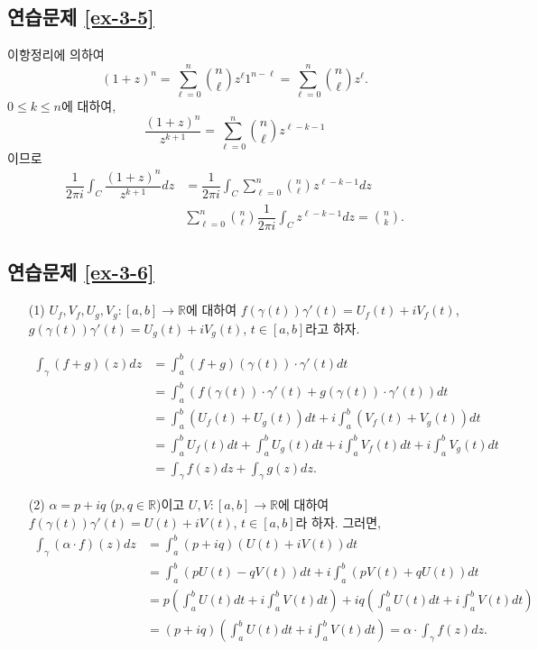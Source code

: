 \subsection*{연습문제 \ref{ex-3-5}}

이항정리에 의하여
\[
(1+z)^n = \sum_{\ell = 0}^n  {n \choose \ell} z^\ell 1^{n-\ell} 
= \sum_{\ell = 0}^n  {n \choose \ell} z^\ell.
\]
$0\le k \le n$에 대하여,
\[
\dfrac{(1+z)^n}{z^{k+1}} =\sum_{\ell = 0}^n  {n \choose \ell} z^{\ell-k-1}
\]
이므로
\begin{align*}
\dfrac1{2\pi i} \int_C \dfrac{(1+z)^n}{z^{k+1}}dz
&= \dfrac1{2\pi i} \int_C \sum_{\ell = 0}^n  {n \choose \ell} z^{\ell-k-1} dz \\
&  \sum_{\ell = 0}^n  {n \choose \ell} \dfrac1{2\pi i} \int_C  z^{\ell-k-1}dz
= {n \choose k}.
\end{align*}

\subsection*{연습문제 \ref{ex-3-6}}
\begin{itemize}
\item[(1)]
$U_f, V_f, U_g, V_g:[a,b] \to \mathbb R$에 대하여
$f(\gamma(t))\gamma'(t) = U_f(t) + iV_f(t)$,
$g(\gamma(t))\gamma'(t) = U_g(t) + iV_g(t)$, $t\in[a,b]$라고 하자.

\begin{align*}
\int_\gamma (f+g)(z)dz
&= \int_a^b (f+g)(\gamma(t))\cdot \gamma'(t)dt \\
&= \int_a^b \left( f(\gamma(t))\cdot \gamma'(t) + g(\gamma(t))\cdot \gamma'(t) \right) dt\\
&= \int_a^b (U_f(t) + U_g(t)) dt + i \int_a^b (V_f(t) + V_g(t)) dt \\
&= \int_a^b U_f(t)dt + \int_a^b U_g(t)dt + i\int_a^b V_f(t)dt + i\int_a^b V_g(t)dt \\
&= \int_\gamma f(z)dz + \int_\gamma g(z)dz.
\end{align*}

\item[(2)] $\alpha = p+iq$ ($p,q\in\mathbb R$)이고
$U,V:  [a,b] \to \mathbb R$에 대하여
$f(\gamma(t))\gamma'(t)  = U(t) + iV(t)$, $t\in[a,b]$라 하자.
그러면,
\begin{align*}
\int_\gamma (\alpha\cdot f)(z) dz
&= \int_a^b (p+iq)(U(t) + iV(t))dt \\
&= \int_a^b(pU(t) - qV(t))dt + i\int_a^b (pV(t) + qU(t))dt \\
&= p \left(\int_a^b U(t)dt + i \int_a^b V(t)dt \right)
+ iq\left(\int_a^b U(t)dt + i \int_a^b V(t)dt \right) \\
&= (p+iq)\left(\int_a^b U(t)dt + i \int_a^b V(t)dt \right)
= \alpha \cdot \int_\gamma f(z)dz.
\end{align*}
\end{itemize}

